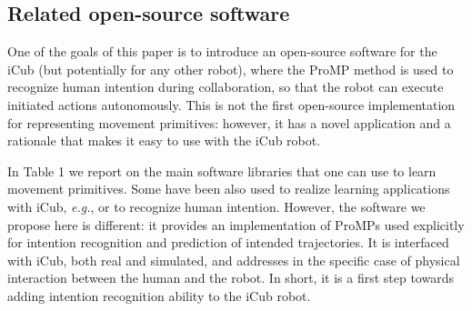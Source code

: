 \documentclass[utf8]{frontiersSCNS} %
\newcommand{\todo}[1]{\textcolor{red}{\textbf{/*#1*/}}}
\begin{document}
\subsection{Related open-source software}

One of the goals of this paper is to introduce an open-source software for the iCub (but potentially for any other robot), where the ProMP method is used to recognize human intention during collaboration, so that the robot can execute initiated actions autonomously.
This is not the first open-source implementation for representing movement primitives: however, it has a novel application and a rationale  
that makes it easy to use with the iCub robot.


In Table 1
we report on the main software libraries that one can use to learn movement primitives. Some have been also used to realize learning applications with iCub, \textit{e.g.}, \cite{lober2014multiple,2013ACTI2891} or to recognize human intention.
However, the software we propose here is different: it provides an implementation of ProMPs used explicitly for intention recognition and prediction of intended trajectories. It is interfaced with iCub, both real and simulated, and addresses in the specific case of physical interaction between the human and the robot. 
In short, it is a first step towards adding intention recognition ability to the iCub robot.%
\end{document}
